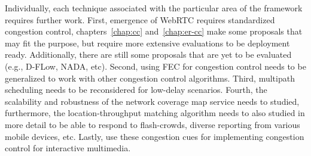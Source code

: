 Individually, each technique associated with the particular area of the
framework requires further work. First, emergence of WebRTC requires
standardized congestion control, chapters~\ref{chap:cc} and~\ref{chap:er-cc}
make some proposals that may fit the purpose, but require more extensive
evaluations to be deployment ready. Additionally, there are still some
proposals that are yet to be evaluated (e.g., D-FLow, NADA, etc). Second,
using FEC for congestion control needs to be generalized to work with other
congestion control algorithms. Third, multipath scheduling needs to be
reconsidered for low-delay scenarios. Fourth, the scalability and robustness
of the network coverage map service needs to studied, furthermore, the
location-throughput matching algorithm needs to also studied in more detail to
be able to respond to flash-crowds, diverse reporting from various mobile
devices, etc. Lastly, use these congestion cues for implementing congestion
control for interactive multimedia.


